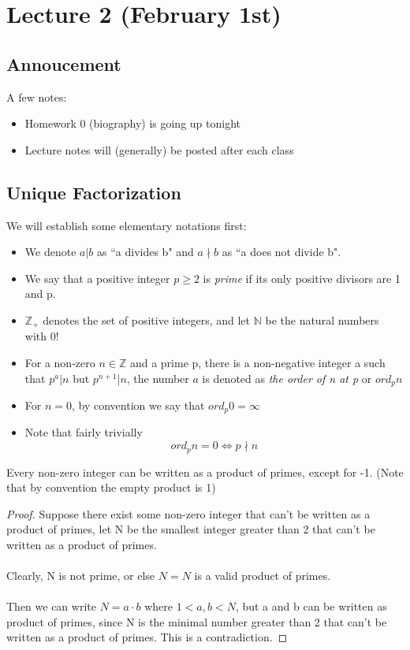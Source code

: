 \section{Lecture 2 (February 1st)}

\subsection{Annoucement}
A few notes:
\begin{itemize}
    \item Homework 0 (biography) is going up tonight
    \item Lecture notes will (generally) be posted after each class
\end{itemize}

\subsection{Unique Factorization}

\begin{definition}
We will establish some elementary notations first:
\begin{itemize}
    \item We denote $a | b$ as ``a divides b" and $a \nmid b$ as ``a does not divide b".
    \item  We say that a positive integer $p \geq 2$ is \textit{prime} if its only positive divisors are 1 and p.
    \item $\mathbb{Z}_+$ denotes the set of positive integers, and let $\mathbb{N}$ be the natural numbers with 0!
    \item For a non-zero $n \in \mathbb{Z}$ and a prime p, there is a non-negative integer a such that $p^a | n$ but $p^{n+1} | n$, the number $a$ is denoted as \textit{the order of n at p} or $ord_pn$
    \item For $n = 0$, by convention we say that $ord_p 0 = \infty$
    \item Note that fairly trivially
    \[ord_p n = 0 \iff p \nmid n\]
\end{itemize}
\end{definition}

\begin{lemma}
Every non-zero integer can be written as a product of primes, except for -1. (Note that by convention the empty product is 1)
\end{lemma}

\begin{proof}
Suppose there exist some non-zero integer that can't be written as a product of primes, let N be the smallest integer greater than 2 that can't be written as a product of primes.\\\\
Clearly, N is not prime, or else $N = N$ is a valid product of primes.\\\\
Then we can write $N = a \cdot b$ where $1 < a, b < N$, but a and b can be written as product of primes, since N is the minimal number greater than 2 that can't be written as a product of primes. This is a contradiction.
\end{proof}

